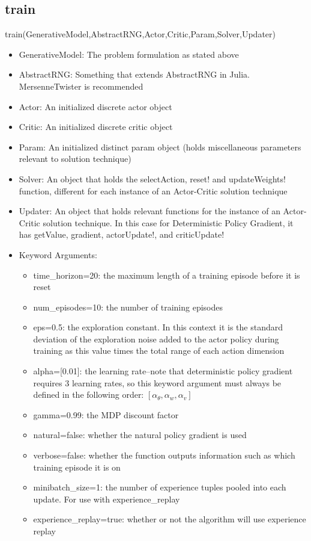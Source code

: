 \documentclass[a4paper]{article}
\begin{document}
\subsection{train}
train(GenerativeModel,AbstractRNG,Actor,Critic,Param,Solver,Updater)
\begin{itemize}
\item GenerativeModel: The problem formulation as stated above
\item AbstractRNG: Something that extends AbstractRNG in Julia. MersenneTwister is recommended
\item Actor: An initialized discrete actor object
\item Critic: An initialized discrete critic object
\item Param: An initialized distinct param object (holds miscellaneous parameters relevant to solution technique)
\item Solver: An object that holds the selectAction, reset! and updateWeights! function, different for each instance of an Actor-Critic solution technique
\item Updater: An object that holds relevant functions for the instance of an Actor-Critic solution technique. In this case for Deterministic Policy Gradient, it has getValue, gradient, actorUpdate!, and criticUpdate!
\item Keyword Arguments:
	\begin{itemize}
	\item time\_horizon=20: the maximum length of a training episode before it is reset
	\item num\_episodes=10: the number of training episodes
	\item eps=0.5: the exploration constant. In this context it is the standard deviation of the exploration noise added to the actor policy during training as this value times the total range of each action dimension
	\item alpha=[0.01]: the learning rate--note that deterministic policy gradient requires 3 learning rates, so this keyword argument must always be defined in the following order: $[\alpha_{\theta},\alpha_w,\alpha_v]$
	\item gamma=0.99: the MDP discount factor
	\item natural=false: whether the natural policy gradient is used
	\item verbose=false: whether the function outputs information such as which training episode it is on
	\item minibatch\_size=1: the number of experience tuples pooled into each update. For use with experience\_replay
	\item experience\_replay=true: whether or not the algorithm will use experience replay
	\end{itemize}
\end{itemize}
\end{document}
